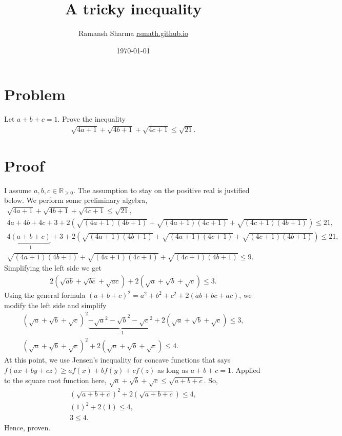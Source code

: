 \documentclass{article}
\title{A tricky inequality}
\author{Ramansh Sharma \url{rsmath.github.io}}
\date{\today}
\begin{document}
\maketitle

\section{Problem}
Let $a+b+c = 1$. Prove the inequality
\begin{align}
\sqrt{4a + 1} + \sqrt{4b + 1} + \sqrt{4c + 1} \le \sqrt{21}.
\end{align}
%
\section{Proof}
I assume $a, b, c \in \mathbb{R}_{\ge 0}$. The assumption to stay on the positive real is justified below. We perform some preliminary algebra,
\begin{align}
\sqrt{4a + 1} + \sqrt{4b + 1} + \sqrt{4c + 1} \le \sqrt{21}, \\ \nonumber
4a + 4b + 4c + 3 + 2 (\sqrt{(4a+1)(4b+1)} + \sqrt{(4a+1)(4c+1)} + \sqrt{(4c+1)(4b+1)}) \le 21, \\ \nonumber
4 \underbrace{(a + b + c)}_{1} + 3 + 2 (\sqrt{(4a+1)(4b+1)} + \sqrt{(4a+1)(4c+1)} + \sqrt{(4c+1)(4b+1)}) \le 21, \\ \nonumber
\sqrt{(4a+1)(4b+1)} + \sqrt{(4a+1)(4c+1)} + \sqrt{(4c+1)(4b+1)} \le 9.
\end{align}
Simplifying the left side we get
\begin{align}
2 (\sqrt{ab} + \sqrt{bc} + \sqrt{ac}) + 2 (\sqrt{a} + \sqrt{b} + \sqrt{c}) \le 3. \nonumber
\end{align}
Using the general formula $(a+b+c)^2 = a^2+b^2+c^2 + 2(ab+bc+ac)$, we modify the left side and simplify
\begin{align}
(\sqrt{a} + \sqrt{b} + \sqrt{c})^2 \underbrace{- \sqrt{a}^2 - \sqrt{b}^2 - \sqrt{c}^2}_{-1} + 2 (\sqrt{a} + \sqrt{b} + \sqrt{c}) \le 3, \\ \nonumber
(\sqrt{a} + \sqrt{b} + \sqrt{c})^2 + 2 (\sqrt{a} + \sqrt{b} + \sqrt{c}) \le 4. \nonumber
\end{align}
At this point, we use Jensen's inequality for concave functions that says $f(ax + by + cz) \ge af(x) + bf(y) + cf(z)$ as long as $a+b+c=1$. Applied to the square root function here, $\sqrt{a} + \sqrt{b} + \sqrt{c} \le \sqrt{a+b+c}$. So,
\begin{align}
(\sqrt{a+b+c})^2 + 2 (\sqrt{a+b+c}) \le 4, \\ \nonumber
(1)^2 + 2 (1) \le 4, \\ \nonumber
3 \le 4.
\end{align}
Hence, proven.
%
\end{document}
